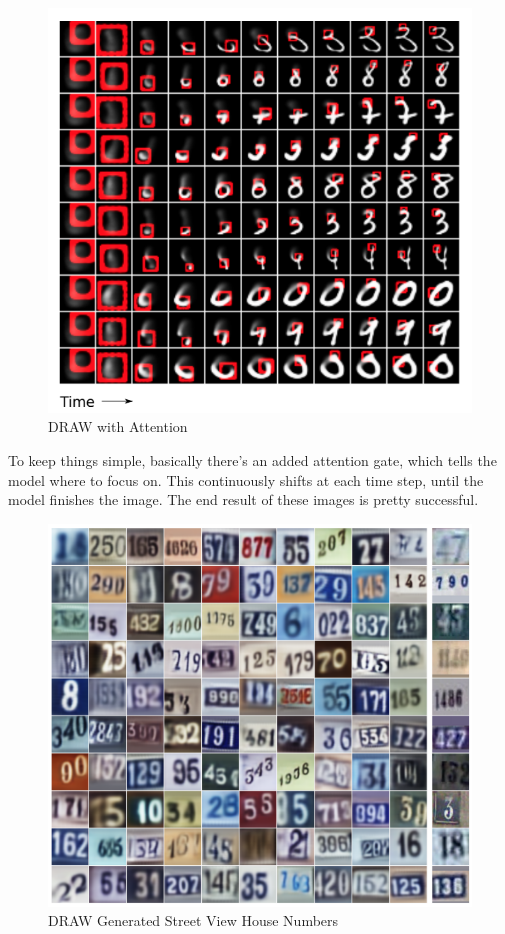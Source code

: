 \documentclass{article}
\begin{document}
\begin{figure}[H]
\centering
\includegraphics[scale=.7]{draw_attention.png}
\caption{DRAW with Attention}
\label{fig:draw_attention}
\end{figure}

To keep things simple, basically there's an added attention gate, which tells the model where to focus on. This continuously shifts at each time step, until the model finishes the image. The end result of these images is pretty successful.

\begin{figure}[H]
\centering
\includegraphics[scale=.7]{draw_streetview.png}
\caption{DRAW Generated Street View House Numbers}
\label{fig:draw_streetview}
\end{figure}
\end{document}
